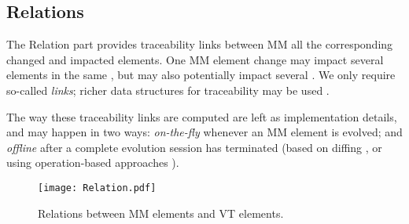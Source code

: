\subsection{Relations}
\label{sec:Suggestion:Relation}

The \textsf{Relation} part provides traceability links between \textsf{MM}
all the corresponding \textsf{changed} and \textsf{impacted} elements.
One \textsf{MM} element change
may impact several elements in the same \viewtype, but may also potentially
impact several \viewtypes. We only require so-called \emph{links}; richer
data structures for traceability may be used \cite{Batot-Cabot-Gerard:2021}.

The way these traceability links are computed are left as implementation
details, and may happen in two ways: \emph{on-the-fly} whenever an \textsf{MM} element is evolved; and \emph{offline}
after a complete evolution session has terminated (based on diffing \cite{Kehrer-Kelter-Taentzer:2011}, or using 
operation-based approaches \cite{J:Lippe-Oosterom:1992}).

\begin{figure}[t]
    \centering
    \texttt{[image: Relation.pdf]}
    \caption{\textsf{Relation}s between \textsf{MM} elements and \textsf{VT} elements.}
    \label{fig:Relation}
\end{figure}

